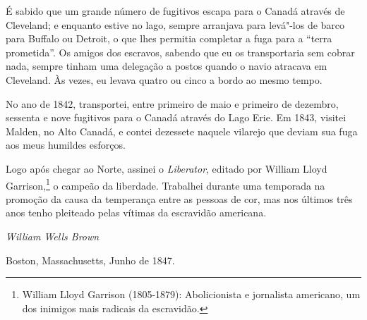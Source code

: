 É sabido que um grande número de fugitivos escapa para o Canadá através
de Cleveland; e enquanto estive no lago, sempre arranjava para levá"-los
de barco para Buffalo ou Detroit, o que lhes permitia completar a fuga
para a ``terra prometida''. Os amigos dos escravos, sabendo que eu os
transportaria sem cobrar nada, sempre tinham uma delegação a postos
quando o navio atracava em Cleveland. Às vezes, eu levava quatro ou
cinco a bordo ao mesmo tempo.

No ano de 1842, transportei, entre primeiro de maio e primeiro de
dezembro, sessenta e nove fugitivos para o Canadá através do Lago Erie.
Em 1843, visitei Malden, no Alto Canadá, e contei dezessete naquele
vilarejo que deviam sua fuga aos meus humildes esforços.

Logo após chegar ao Norte, assinei o \emph{Liberator}, editado por
William Lloyd Garrison,\footnote{William Lloyd Garrison (1805-1879):
  Abolicionista e jornalista americano, um dos inimigos mais radicais da
  escravidão.} o campeão da liberdade. Trabalhei durante uma temporada
na promoção da causa da temperança entre as pessoas de cor, mas nos
últimos três anos tenho pleiteado pelas vítimas da escravidão americana.

\begin{flushright}
\emph{William Wells Brown}

Boston, Massachusetts, Junho de 1847.
\end{flushright}


